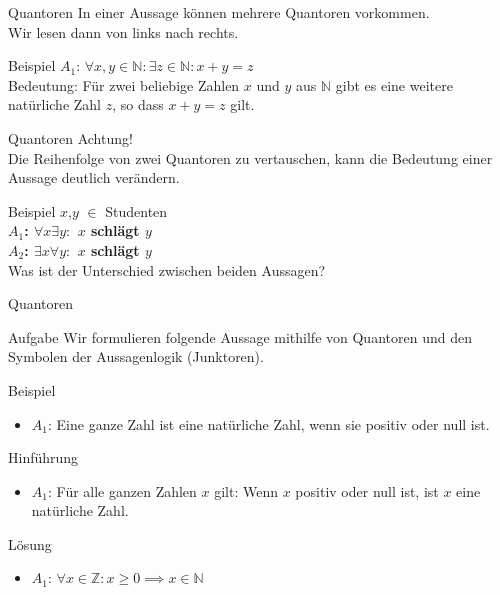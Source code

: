 \begin{frame}[fragile]{Quantoren}
    In einer Aussage können mehrere Quantoren vorkommen.\\
    Wir lesen dann von links nach rechts.
    \begin{exampleblock}{Beispiel}
        $A_1$: $\forall x,y \in \mathbb{N}: \exists z \in \mathbb{N}: x+y = z$\\
        Bedeutung: Für zwei beliebige Zahlen $x$ und $y$ aus $\mathbb{N}$ gibt es eine weitere natürliche Zahl $z$, so dass $x+y=z$ gilt.
    \end{exampleblock}
\end{frame}

\begin{frame}[fragile]{Quantoren}
    \alert{Achtung!}\\
    Die Reihenfolge von zwei Quantoren zu vertauschen, kann die Bedeutung einer Aussage deutlich verändern.
    \begin{exampleblock}{Beispiel}
        $x$,$y$ $\in$ Studenten\\
        \textbf{$A_1$: $\forall x \exists y:$ $x$ schlägt $y$\\
        $A_2$: $\exists x \forall y:$ $x$ schlägt $y$\\ }
        Was ist der Unterschied zwischen beiden Aussagen?
    \end{exampleblock}
\end{frame}

\begin{frame}{Quantoren}
    \begin{alertblock}{Aufgabe}
      Wir formulieren folgende Aussage mithilfe von Quantoren und den Symbolen der Aussagenlogik (Junktoren).
    \end{alertblock}
    \begin{block}{Beispiel}
    \begin{itemize}
        \item $A_1$: Eine ganze Zahl ist eine natürliche Zahl, wenn sie positiv oder null ist.
    \end{itemize}
    \end{block}
    \begin{block}{Hinführung}
    \begin{itemize}
        \item $A_1$: Für alle ganzen Zahlen $x$ gilt: Wenn $x$ positiv oder null ist, ist $x$ eine natürliche Zahl.
    \end{itemize}
    \end{block}
    \begin{block}{\alert{Lösung}}
    \begin{itemize}
        \item $A_1$: $\forall x \in \mathbb{Z}: x \geq 0 \implies x \in \mathbb{N}$
    \end{itemize}
    \end{block}
\end{frame}

